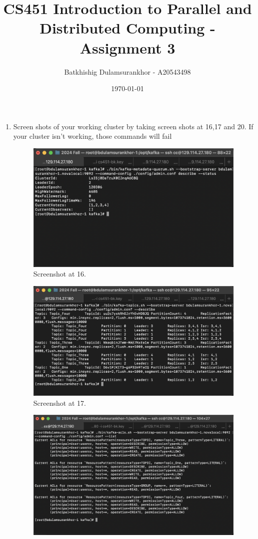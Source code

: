 \documentclass{article}
\title{CS451 Introduction to Parallel and Distributed Computing - Assignment 3}
\author{Batkhishig Dulamsurankhor - A20543498}
\date{\today} %
\begin{document}
\maketitle

\begin{enumerate}
  \item Screen shots of your working cluster by taking screen shots at 16,17 and 20. If your cluster isn't working, those commands will fail
  \begin{figure}[H]
    \centering
    \includegraphics[width=\textwidth]{image1.png}
    \caption{Screenshot at 16.}
  \end{figure}
  \begin{figure}[H]
    \centering
    \includegraphics[width=\textwidth]{image2.png}
    \caption{Screenshot at 17.}
  \end{figure}
  \begin{figure}[H]
    \centering
    \includegraphics[width=\textwidth]{image3.png}

\end{figure}
\end{enumerate}
\end{document}
